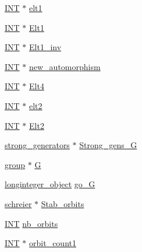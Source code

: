 \begin{DoxyCompactItemize}
\item 
\mbox{\hyperlink{galois_8h_a09fddde158a3a20bd2dcadb609de11dc}{I\+NT}} $\ast$ \mbox{\hyperlink{classcompute__stabilizer_a65535db7d3d0436c45509af610119906}{elt1}}
\item 
\mbox{\hyperlink{galois_8h_a09fddde158a3a20bd2dcadb609de11dc}{I\+NT}} $\ast$ \mbox{\hyperlink{classcompute__stabilizer_a8ec8e9cb82294d81f0475b0a7b236346}{Elt1}}
\item 
\mbox{\hyperlink{galois_8h_a09fddde158a3a20bd2dcadb609de11dc}{I\+NT}} $\ast$ \mbox{\hyperlink{classcompute__stabilizer_a8645fe1b43f3bfd42c7d0e55f5d1cf3c}{Elt1\+\_\+inv}}
\item 
\mbox{\hyperlink{galois_8h_a09fddde158a3a20bd2dcadb609de11dc}{I\+NT}} $\ast$ \mbox{\hyperlink{classcompute__stabilizer_a48fd565bcee5a121fff19e0af63948b9}{new\+\_\+automorphism}}
\item 
\mbox{\hyperlink{galois_8h_a09fddde158a3a20bd2dcadb609de11dc}{I\+NT}} $\ast$ \mbox{\hyperlink{classcompute__stabilizer_aff801189cdd3439f92659ee0bc037937}{Elt4}}
\item 
\mbox{\hyperlink{galois_8h_a09fddde158a3a20bd2dcadb609de11dc}{I\+NT}} $\ast$ \mbox{\hyperlink{classcompute__stabilizer_aa9a04f16bf9ef04268f6962247493089}{elt2}}
\item 
\mbox{\hyperlink{galois_8h_a09fddde158a3a20bd2dcadb609de11dc}{I\+NT}} $\ast$ \mbox{\hyperlink{classcompute__stabilizer_afa8a01ef60b36d513c5cea8651cc7ccb}{Elt2}}
\item 
\mbox{\hyperlink{classstrong__generators}{strong\+\_\+generators}} $\ast$ \mbox{\hyperlink{classcompute__stabilizer_a0b00943c2fc24a136769d0a5903ca807}{Strong\+\_\+gens\+\_\+G}}
\item 
\mbox{\hyperlink{classgroup}{group}} $\ast$ \mbox{\hyperlink{classcompute__stabilizer_a78b7fe2c050a875fd4a41c051a456a7a}{G}}
\item 
\mbox{\hyperlink{classlonginteger__object}{longinteger\+\_\+object}} \mbox{\hyperlink{classcompute__stabilizer_a568a1e3ff78cf6674f55f5bd8f1a377b}{go\+\_\+G}}
\item 
\mbox{\hyperlink{classschreier}{schreier}} $\ast$ \mbox{\hyperlink{classcompute__stabilizer_acd7805a97ded7564031579591915dc02}{Stab\+\_\+orbits}}
\item 
\mbox{\hyperlink{galois_8h_a09fddde158a3a20bd2dcadb609de11dc}{I\+NT}} \mbox{\hyperlink{classcompute__stabilizer_a3637db126898ec11219129405c341953}{nb\+\_\+orbits}}
\item 
\mbox{\hyperlink{galois_8h_a09fddde158a3a20bd2dcadb609de11dc}{I\+NT}} $\ast$ \mbox{\hyperlink{classcompute__stabilizer_a250c7e5c4babe2231110426a3b1b53dd}{orbit\+\_\+count1}}

\end{DoxyCompactItemize}
